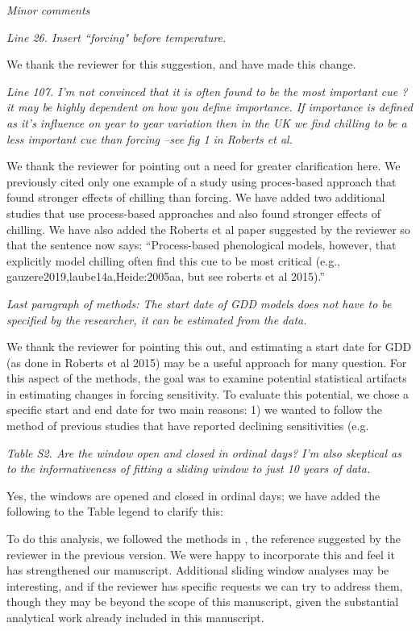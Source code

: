 \documentclass[11pt, a4paper]{article}
\begin{document}
\par \emph{Minor comments}
\par \emph{Line 26. Insert ``forcing" before temperature.}
\par We thank the reviewer for this suggestion, and have made this change.
\par \emph{Line 107. I'm not convinced that it is often found to be the most important cue ? it may be highly
dependent on how you define importance. If importance is defined as it's influence on year to year
variation then in the UK we find chilling to be a less important cue than forcing --see fig 1 in Roberts et
al.}
\par We thank the reviewer for pointing out a need for greater clarification here. We previously cited only one example of a study using proces-based approach that found stronger effects of chilling than forcing. We have added two additional studies that use process-based approaches and also found stronger effects of chilling. We have also added the Roberts et al paper suggested by the reviewer so that the sentence now says:
``Process-based phenological models, however, that explicitly model chilling often find this cue to be most critical (e.g., gauzere2019,laube14a,Heide:2005aa, but see roberts et al 2015).''

\par \emph{Last paragraph of methods: The start date of GDD models does not have to be specified by the
researcher, it can be estimated from the data.}
\par We thank the reviewer for pointing this out, and estimating a start date for GDD (as done in Roberts et al 2015) may be a useful approach for many question. For this aspect of the methods, the goal was to examine potential statistical artifacts in estimating changes in forcing sensitivity. To evaluate this potential, we chose a specific start and end date for two main reasons: 1) we wanted to follow the method of previous studies that have reported declining sensitivities (e.g.
\par \emph{Table S2. Are the window open and closed in ordinal days? I'm also skeptical as to the informativeness
of fitting a sliding window to just 10 years of data.}
\par Yes, the windows are opened and closed in ordinal days; we have added the following to the Table legend to clarify this:

To do this analysis, we followed the methods in , the reference suggested by the reviewer in the previous version. We were happy to incorporate this and feel it has strengthened our manuscript. Additional sliding window analyses may be interesting, and if the reviewer has specific requests we can try to address them, though they may be beyond the scope of this manuscript, given the substantial analytical work already included in this manuscript.
\end{document}
